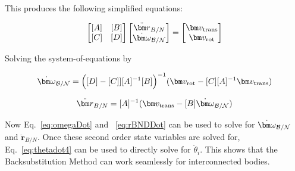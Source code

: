 This produces the following simplified equations:

\begin{equation}
	\begin{bmatrix}
		[A] & [B]\\
		[C] & [D]
	\end{bmatrix} \begin{bmatrix}
		\ddot{\bm r}_{B/N}\\
		\dot{\bm\omega}_{\cal B/N}
	\end{bmatrix} = \begin{bmatrix}
		\bm v_{\text{trans}}\\
		\bm v_{\text{rot}}
	\end{bmatrix}
\end{equation}

Solving the system-of-equations by

\begin{equation}
	\dot{\bm\omega}_{\cal B/N} = \Big([D] - [C]][A]^{-1}[B]\Big)^{-1}(\bm v_{\text{rot}} - [C][A]^{-1}\bm v_{\text{trans}})
	\label{eq:omegaDot}
\end{equation}

\begin{equation}
	\ddot{\bm r}_{B/N} = [A]^{-1} (\bm v_{\text{trans}} - [B]\dot{\bm\omega}_{\cal B/N})
	\label{eq:rBNDDot}
\end{equation}

Now Eq.~\eqref{eq:omegaDot} and ~\eqref{eq:rBNDDot} can be used to solve for $\dot{\bm\omega}_{\cal B/N}$ and $\ddot{\bm r}_{B/N}$. Once these second order state variables are solved for, Eq.~\eqref{eq:thetadot4} can be used to directly solve for $\ddot \theta_{i}$. This shows that the Backsubstitution Method can work seamlessly for interconnected bodies.
